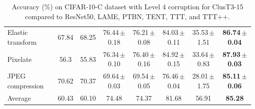 \documentclass{article}
\newcommand{\ppm}{\,\scriptsize$\pm$}
\begin{document}
\begin{table}[!t]
\begin{small}
{\begin{tabular}{l|ccccccc}
        Elastic transform & 67.84 & 68.25 & 76.44\ppm0.18 & 76.21\ppm0.08 & 84.03\ppm0.11 & 35.53\ppm1.51 & \textbf{86.74\ppm0.04} \\ 
        Pixelate & 56.3 & 55.83 & 76.34\ppm0.10 & 76.40\ppm0.16 & 84.92\ppm0.15 & 33.64\ppm0.83 & \textbf{87.93\ppm0.03} \\ 
        JPEG compression & 70.62 & 70.37 & 69.64\ppm0.03 & 69.54\ppm0.05 & 76.46\ppm0.04 & 28.01\ppm1.75 & \textbf{85.11\ppm0.06} \\ \midrule
        Average & 60.43 & 60.10 & 74.48 & 74.37 & 81.68 & 56.91 & \textbf{85.28} \\ \bottomrule
    \end{tabular}}
    \end{small}
    \caption{Accuracy (\%) on CIFAR-10-C dataset with Level 4 corruption for ClusT3-15 compared to ResNet50, LAME, PTBN, TENT, TTT, and TTT++.}
	\label{tab:Cifar10cComparisonL4}
\end{table}
\end{document}
